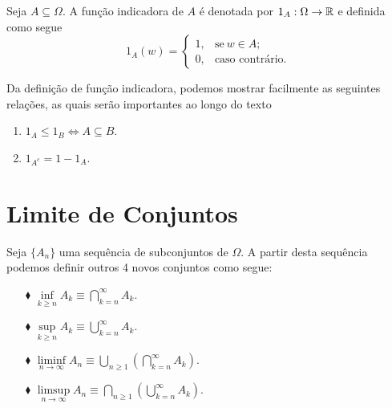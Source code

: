\begin{definicao}\label{def-funcao-indicadora}
	Seja $A \subseteq \Omega$. 
	A função indicadora  
	de $A$ é denotada por $1_A: \Omega \to \mathbb{R}$ e definida 
	como segue
	\[
		1_A(w) =
			\begin{cases}
				1, & \text{se}\ w \in A; \\
				0, & \text{caso contrário.}
			\end{cases}
	\]
\end{definicao}








\begin{observacao} 
	Da definição de função indicadora, podemos mostrar facilmente 
	as seguintes relações,
	as quais serão importantes ao longo do texto
	\begin{enumerate}
		\item 
		$1_A \leqslant 1_B \Leftrightarrow A \subseteq B$.

		\item
		$1_{A^c}= 1- 1_A$.
\end{enumerate}
\end{observacao}







\section{Limite de Conjuntos}

Seja $\{A_n\}$ uma sequência de subconjuntos de $\Omega$.
A partir desta sequência podemos definir outros 4 novos conjuntos
como segue:
\begin{enumerate}
\item[$\blacklozenge$] 
	$\inf \limits_{k\geqslant n} A_k 
	\equiv 
	\displaystyle\bigcap_{k=n}^{\infty}{A_k}$.

\item[$\blacklozenge$] 
	$\sup \limits_{k\geqslant n} A_k 
	\equiv 
	\displaystyle\bigcup_{k=n}^{\infty}{A_k}$.

\item[$\blacklozenge$] 
	$\liminf \limits_{n \to \infty} A_n 
	\equiv 
	\displaystyle\bigcup_ {n\geqslant 1} 
		\left(\displaystyle\bigcap_{k=n}^{\infty}{A_k} \right)
	$.

\item[$\blacklozenge$] 
	$\limsup \limits_{n \to \infty} A_n 
	\equiv 
	\displaystyle\bigcap_ {n\geqslant 1} 
		\left(\displaystyle\bigcup_{k=n}^{\infty}{A_k} \right)
	$.
\end{enumerate}






